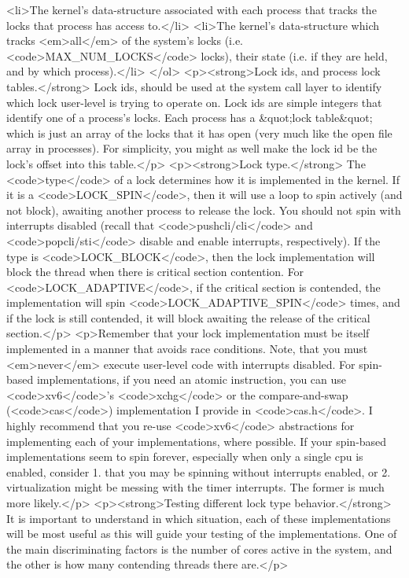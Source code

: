 \documentclass[]{}
\begin{document}
<li>The kernel's data-structure associated with each process that tracks the locks that process has access to.</li>
<li>The kernel's data-structure which tracks <em>all</em> of the system's locks (i.e. <code>MAX_NUM_LOCKS</code> locks), their state (i.e. if they are held, and by which process).</li>
</ol>
<p><strong>Lock ids, and process lock tables.</strong> Lock ids, should be used at the system call layer to identify which lock user-level is trying to operate on. Lock ids are simple integers that identify one of a process's locks. Each process has a &quot;lock table&quot; which is just an array of the locks that it has open (very much like the open file array in processes). For simplicity, you might as well make the lock id be the lock's offset into this table.</p>
<p><strong>Lock type.</strong> The <code>type</code> of a lock determines how it is implemented in the kernel. If it is a <code>LOCK_SPIN</code>, then it will use a loop to spin actively (and not block), awaiting another process to release the lock. You should not spin with interrupts disabled (recall that <code>pushcli/cli</code> and <code>popcli/sti</code> disable and enable interrupts, respectively). If the type is <code>LOCK_BLOCK</code>, then the lock implementation will block the thread when there is critical section contention. For <code>LOCK_ADAPTIVE</code>, if the critical section is contended, the implementation will spin <code>LOCK_ADAPTIVE_SPIN</code> times, and if the lock is still contended, it will block awaiting the release of the critical section.</p>
<p>Remember that your lock implementation must be itself implemented in a manner that avoids race conditions. Note, that you must <em>never</em> execute user-level code with interrupts disabled. For spin-based implementations, if you need an atomic instruction, you can use <code>xv6</code>'s <code>xchg</code> or the compare-and-swap (<code>cas</code>) implementation I provide in <code>cas.h</code>. I highly recommend that you re-use <code>xv6</code> abstractions for implementing each of your implementations, where possible. If your spin-based implementations seem to spin forever, especially when only a single cpu is enabled, consider 1. that you may be spinning without interrupts enabled, or 2. virtualization might be messing with the timer interrupts. The former is much more likely.</p>
<p><strong>Testing different lock type behavior.</strong> It is important to understand in which situation, each of these implementations will be most useful as this will guide your testing of the implementations. One of the main discriminating factors is the number of cores active in the system, and the other is how many contending threads there are.</p>
\end{document}
